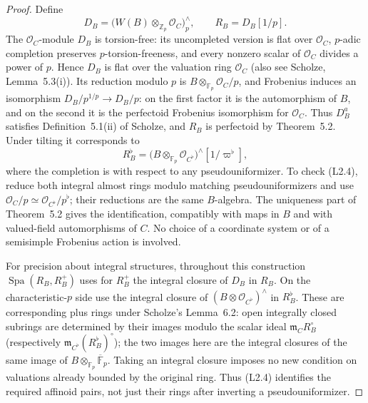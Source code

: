 \documentclass[11pt]{article}
\theoremstyle{remark}
\begin{document}
\begin{proof}
Define
\[
 D_B=\bigl(W(B)\otimes_{\mathbb Z_p}\mathcal O_C\bigr)^{\wedge}_p,
 \qquad R_B=D_B[1/p].
\]
The $\mathcal O_C$-module $D_B$ is torsion-free: its uncompleted
version is flat over $\mathcal O_C$, $p$-adic completion preserves
$p$-torsion-freeness, and every nonzero scalar of $\mathcal O_C$
divides a power of $p$.  Hence $D_B$ is flat over the valuation ring
$\mathcal O_C$ (also see Scholze, Lemma~5.3(i)).  Its reduction modulo
$p$ is $B\otimes_{\mathbb F_p}\mathcal O_C/p$, and Frobenius induces
an isomorphism $D_B/p^{1/p}\longrightarrow D_B/p$: on the first
factor it is the automorphism of $B$, and on the second it is the
perfectoid Frobenius isomorphism for $\mathcal O_C$.  Thus $D_B^a$
satisfies Definition~5.1(ii) of Scholze, and $R_B$ is perfectoid by
Theorem~5.2.  Under tilting it corresponds to
\[
 R_B^\flat=
 \bigl(B\otimes_{\mathbb F_p}\mathcal O_{C^\flat}\bigr)^{\wedge}[1/\varpi^\flat],
 \tag{L2.4}
\]
where the completion is with respect to any pseudouniformizer.  To
check (L2.4), reduce both integral almost rings modulo matching
pseudouniformizers and use
$\mathcal O_C/p\simeq\mathcal O_{C^\flat}/p^\flat$; their reductions
are the same $B$-algebra.  The uniqueness part of Theorem~5.2 gives
the identification, compatibly with maps in $B$ and with valued-field
automorphisms of $C$.  No choice of a coordinate system or of a
semisimple Frobenius action is involved.

For precision about integral structures, throughout this construction
$\operatorname{Spa}(R_B,R_B^+)$ uses for $R_B^+$ the integral closure
of $D_B$ in $R_B$.  On the characteristic-$p$ side use the integral
closure of $(B\otimes\mathcal O_{C^\flat})^{\wedge}$ in $R_B^\flat$.
These are corresponding plus rings under Scholze's Lemma~6.2: open
integrally closed subrings are determined by their images modulo
the scalar ideal $\mathfrak m_C R_B^\circ$ (respectively
$\mathfrak m_{C^\flat}(R_B^\flat)^\circ$); the two images here
are the integral closures of the same image of
$B\otimes_{\mathbb F_p}\overline{\mathbb F}_p$.  Taking an integral
closure imposes no new condition on valuations already bounded by
the original ring.  Thus (L2.4) identifies the required affinoid
pairs, not just their rings after inverting a pseudouniformizer.


\end{proof}
\end{document}
